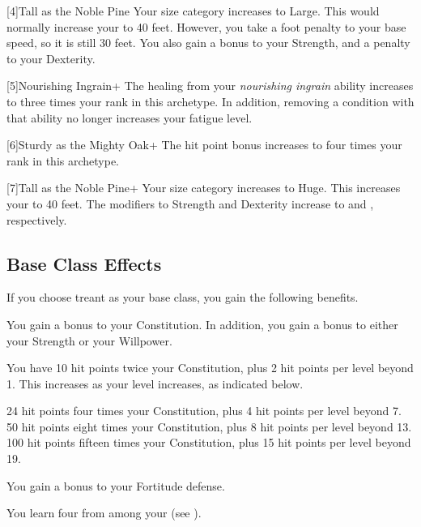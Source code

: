     [4]{Tall as the Noble Pine} Your size category increases to Large.
      This would normally increase your  to 40 feet.
      However, you take a  foot penalty to your base speed, so it is still 30 feet.
      You also gain a  bonus to your Strength, and a  penalty to your Dexterity.

    [5]{Nourishing Ingrain+} The healing from your \textit{nourishing ingrain} ability increases to three times your rank in this archetype.
      In addition, removing a condition with that ability no longer increases your fatigue level.

    [6]{Sturdy as the Mighty Oak+} The hit point bonus increases to four times your rank in this archetype.

    [7]{Tall as the Noble Pine+} Your size category increases to Huge.
      This increases your  to 40 feet.
      The modifiers to Strength and Dexterity increase to  and , respectively.

  \subsection{Base Class Effects}
    If you choose treant as your base class, you gain the following benefits.

      You gain a  bonus to your Constitution. In addition, you gain a  bonus to either your Strength or your Willpower.

      You have 10 hit points \add twice your Constitution, plus 2 hit points per level beyond 1.
      This increases as your level increases, as indicated below.
      \begin{itemize}
         24 hit points \add four times your Constitution, plus 4 hit points per level beyond 7.
         50 hit points \add eight times your Constitution, plus 8 hit points per level beyond 13.
         100 hit points \add fifteen times your Constitution, plus 15 hit points per level beyond 19.
      \end{itemize}

      You gain a  bonus to your Fortitude defense.

      You learn four  from among your  (see ).


